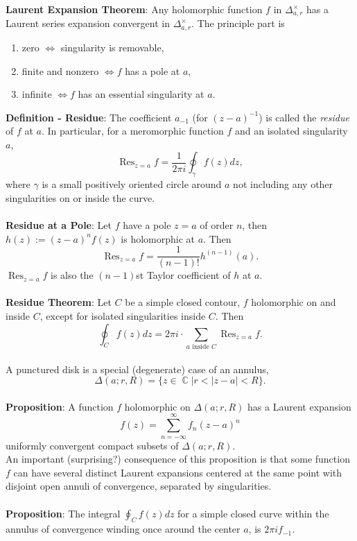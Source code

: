 \documentclass{article}
\DeclareMathOperator{\C}{\mathbb{C}}
\DeclareMathOperator{\Res}{Res}
\begin{document}
\textbf{Laurent Expansion Theorem}: Any holomorphic function $f$ in $\Delta_{a, r}^\times$ has a Laurent series expansion convergent in $\Delta_{a, r}^\times$. The principle part is \begin{enumerate}
    \item zero $\iff$ singularity is removable,
    \item finite and nonzero $\iff f$ has a pole at $a$,
    \item infinite $\iff f$ has an essential singularity at $a$.
\end{enumerate} $ $ \\
\textbf{Definition - Residue}:  The coefficient $a_{-1}$ (for $(z - a)^{-1}$) is called the \textit{residue} of $f$ at $a$. In particular, for a meromorphic function $f$ and an isolated singularity $a$, $$\Res_{z = a} f = \frac{1}{2\pi i}\oint_\gamma f(z)dz,$$ where $\gamma$ is a small positively oriented circle around $a$ not including any other singularities on or inside the curve. \\ \\
\textbf{Residue at a Pole}: Let $f$ have a pole $z = a$ of order $n$, then $h(z) := (z - a)^nf(z)$ is holomorphic at $a$. Then $$\Res_{z = a} f = \frac{1}{(n - 1)!} h^{(n - 1)}(a).$$ $\Res_{z = a} f$ is also the $(n - 1)$st Taylor coefficient of $h$ at $a$. \\ \\
\textbf{Residue Theorem}: Let $C$ be a simple closed contour, $f$ holomorphic on and inside $C$, except for isolated singularities inside $C$. Then $$\oint_C f(z)dz = 2\pi i \cdot \sum_{a \text{ inside } C} \Res_{z = a} f.$$ \\
A punctured disk is a special (degenerate) case of an annulus, $$\Delta(a; r, R) = \{z \in \C| r < |z - a| < R\}.$$ \\
\textbf{Proposition}: A function $f$ holomorphic on $\Delta(a; r, R)$ has a Laurent expansion $$f(z) = \sum_{n = -\infty}^\infty f_n (z - a)^n$$ uniformly convergent compact subsets of $\Delta(a; r, R)$. \\
An important (surprising?) consequence of this proposition is that some function $f$ can have several distinct Laurent expansions centered at the same point with disjoint open annuli of convergence, separated by singularities. \\ \\
\textbf{Proposition}: The integral $\oint_C f(z)dz$ for a simple closed curve within the annulus of convergence winding once around the center $a$, is $2\pi i f_{-1}.$ \\ \\
\end{document}
